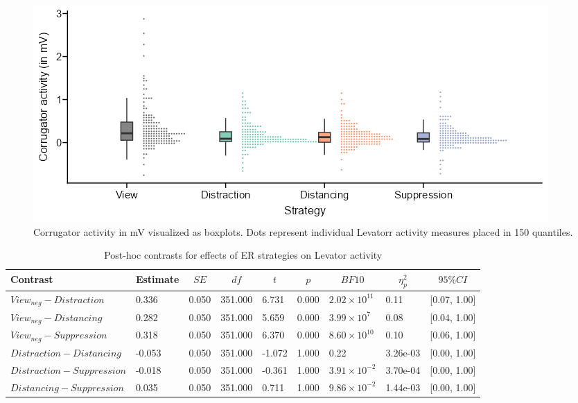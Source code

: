 \documentclass[
  man,floatsintext]{apa6}
\begin{document}
\begin{figure}[H]
\includegraphics[width=\textwidth]{figures/FigCorrReg} \caption{Corrugator activity in mV visualized as boxplots. Dots represent individual Levatorr activity measures placed in 150 quantiles.}\label{fig:SupplFigCorrReg}
\end{figure}

\begin{table}[H]

\begin{center}
\begin{threeparttable}

\caption{\label{tab:SupplEffectLevReg}Post-hoc contrasts for effects of ER strategies on Levator activity}

\footnotesize{

\begin{tabular}{lllllllll}
\toprule
Contrast & \multicolumn{1}{c}{Estimate} & \multicolumn{1}{c}{$SE$} & \multicolumn{1}{c}{$df$} & \multicolumn{1}{c}{$t$} & \multicolumn{1}{c}{$p$} & \multicolumn{1}{c}{$BF10$} & \multicolumn{1}{c}{$\eta_{p}^{2}$} & \multicolumn{1}{c}{$95\% CI$}\\
\midrule
$View_{neg} - Distraction$ & 0.336 & 0.050 & 351.000 & 6.731 & 0.000 & $2.02 \times 10^{11}$ & 0.11 & {}[0.07, 1.00]\\
$View_{neg} - Distancing$ & 0.282 & 0.050 & 351.000 & 5.659 & 0.000 & $3.99 \times 10^{7}$ & 0.08 & {}[0.04, 1.00]\\
$View_{neg} - Suppression$ & 0.318 & 0.050 & 351.000 & 6.370 & 0.000 & $8.60 \times 10^{10}$ & 0.10 & {}[0.06, 1.00]\\
$Distraction - Distancing$ & -0.053 & 0.050 & 351.000 & -1.072 & 1.000 & 0.22 & 3.26e-03 & {}[0.00, 1.00]\\
$Distraction - Suppression$ & -0.018 & 0.050 & 351.000 & -0.361 & 1.000 & $3.91 \times 10^{-2}$ & 3.70e-04 & {}[0.00, 1.00]\\
$Distancing - Suppression$ & 0.035 & 0.050 & 351.000 & 0.711 & 1.000 & $9.86 \times 10^{-2}$ & 1.44e-03 & {}[0.00, 1.00]\\
\bottomrule
\end{tabular}

}

\end{threeparttable}
\end{center}

\end{table}
\end{document}
